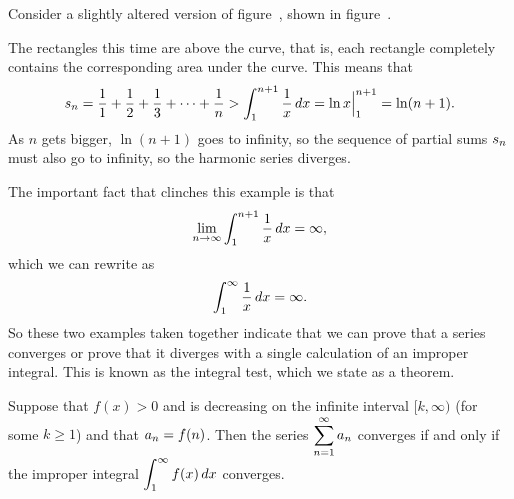 \begin{example} Consider a slightly altered version of figure~, shown in figure~.

The rectangles this time are above the curve, that is, each rectangle
completely contains the corresponding area under the curve. This means
that 
$$s_n = {1\over 1}+{1\over 2}+{1\over 3}+\cdots+{1\over n}
> \int_1^{n+1} {1\over x}\,dx = \ln x\Big|_1^{n+1}=\ln(n+1).$$
As $n$ gets bigger, $\ln(n+1)$ goes to infinity, so the sequence of
partial sums $\displaystyle s_n$ must also go to infinity, so the harmonic series
diverges. 
\end{example}

The important fact that clinches this example is that
$$\lim_{n\to\infty} \int_1^{n+1} {1\over x}\,dx = \infty,$$
which we can rewrite as
$$\int_1^\infty {1\over x}\,dx = \infty.$$
So these two examples taken together indicate that we can prove that a
series converges or prove that it diverges with a single calculation
of an improper integral. This is known as the {\dfont integral
  test\/}, 
which we state as a theorem.

\begin{theorem} Suppose that $f(x)>0$ and is decreasing on the infinite interval
$[k,\infty)$ (for some $k\ge1$)
and that $\displaystyle a_n=f(n)$. Then the series
$\displaystyle\sum_{n=1}^\infty a_n$ converges if and only if the improper
integral $\displaystyle\int_{1}^\infty f(x)\,dx$ converges.
\end{theorem}

